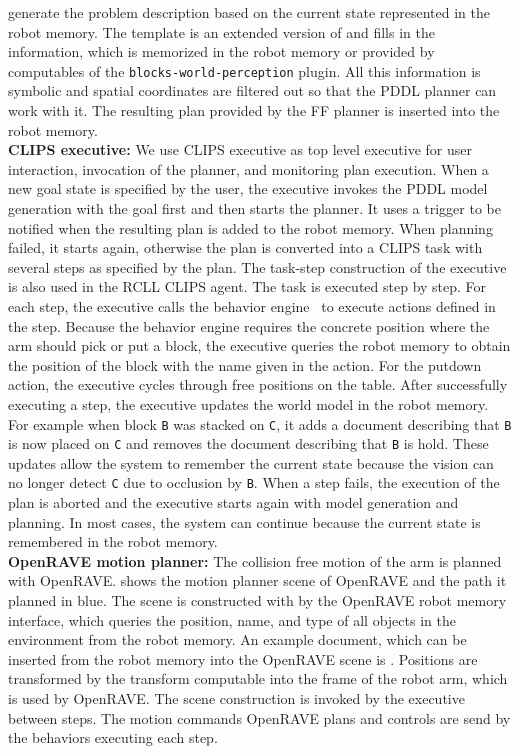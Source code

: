 generate the problem description based on the current state
represented in the robot memory. The template is an extended version
of  and fills in the information, which is
memorized in the robot memory or provided by computables of the
\texttt{blocks-world-perception} plugin. All this information is
symbolic and spatial coordinates are filtered out so that the PDDL
planner can work with it. The resulting plan provided by the FF
planner is inserted into the robot memory.
\\
\textbf{CLIPS executive:} We use CLIPS executive as top level
executive for user interaction, invocation of the planner, and
monitoring plan execution. When a new goal state is specified by the
user, the executive invokes the PDDL model generation with the goal
first and then starts the planner. It uses a trigger to be notified
when the resulting plan is added to the robot memory. When planning
failed, it starts again, otherwise the plan is converted into a CLIPS
task with several steps as specified by the plan. The task-step
construction of the executive is also used in the RCLL CLIPS
agent. The task is executed step by step. For each step, the executive
calls the behavior engine~\cite{Behavior-Engine} to execute actions
defined in the step. Because the behavior engine requires the concrete
position where the arm should pick or put a block, the executive
queries the robot memory to obtain the position of the block with the
name given in the action. For the putdown action, the executive cycles
through free positions on the table. After successfully executing a
step, the executive updates the world model in the robot memory. For
example when block \texttt{B} was stacked on \texttt{C}, it adds a
document describing that \texttt{B} is now placed on \texttt{C} and
removes the document describing that \texttt{B} is hold. These updates
allow the system to remember the current state because the vision can
no longer detect \texttt{C} due to occlusion by \texttt{B}. When a
step fails, the execution of the plan is aborted and the executive
starts again with model generation and planning. In most cases, the
system can continue because the current state is remembered in the
robot memory.
\\
\textbf{OpenRAVE motion planner:} The collision free motion of the arm
is planned with OpenRAVE.
 shows the motion planner scene of OpenRAVE
and the path it planned in blue. The scene is constructed with by the OpenRAVE
robot memory interface, which queries the position, name, and type of
all objects in the environment from the robot memory. An example
document, which can be inserted from the robot memory into the
OpenRAVE scene is . Positions are
transformed by the transform computable into the frame of the robot
arm, which is used by OpenRAVE. The scene construction is invoked by
the executive between steps. The motion commands OpenRAVE plans and
controls are send by the behaviors executing each step.